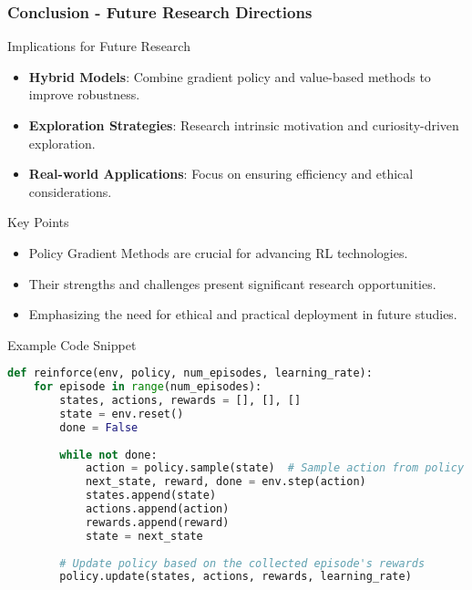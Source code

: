 \documentclass[aspectratio=169]{beamer}
\begin{document}
\begin{frame}[fragile]
    \frametitle{Conclusion - Future Research Directions}
    \begin{block}{Implications for Future Research}
        \begin{itemize}
            \item \textbf{Hybrid Models}: Combine gradient policy and value-based methods to improve robustness.
            \item \textbf{Exploration Strategies}: Research intrinsic motivation and curiosity-driven exploration.
            \item \textbf{Real-world Applications}: Focus on ensuring efficiency and ethical considerations.
        \end{itemize}
    \end{block}

    \begin{block}{Key Points}
        \begin{itemize}
            \item Policy Gradient Methods are crucial for advancing RL technologies.
            \item Their strengths and challenges present significant research opportunities.
            \item Emphasizing the need for ethical and practical deployment in future studies.
        \end{itemize}
    \end{block}
    
    \begin{block}{Example Code Snippet}
        \begin{lstlisting}[language=Python]
def reinforce(env, policy, num_episodes, learning_rate):
    for episode in range(num_episodes):
        states, actions, rewards = [], [], []
        state = env.reset()
        done = False
        
        while not done:
            action = policy.sample(state)  # Sample action from policy
            next_state, reward, done = env.step(action)
            states.append(state)
            actions.append(action)
            rewards.append(reward)
            state = next_state
            
        # Update policy based on the collected episode's rewards
        policy.update(states, actions, rewards, learning_rate)
        \end{lstlisting}
    \end{block}
\end{frame}
\end{document}
